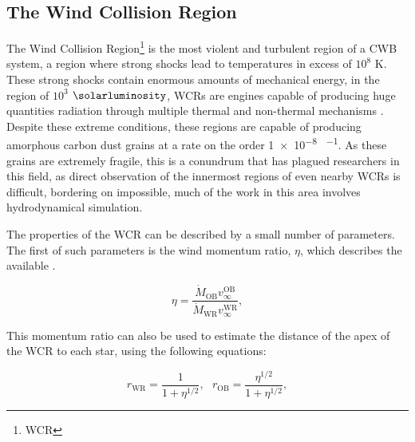 


\subsection{The Wind Collision Region}
\label{sec:wcr}

The Wind Collision Region\footnote{WCR} is the most violent and turbulent region of a CWB system, a region where strong shocks lead to temperatures in excess of $10^8$ $\si{\kelvin}$.
These strong shocks contain enormous amounts of mechanical energy, in the region of $10^3$ $\si{\solarluminosity}$, WCRs are engines capable of producing huge quantities radiation through multiple thermal and non-thermal mechanisms \parencite{eichler_particle_1993,grimaldoProtonAccelerationColliding2019}.
Despite these extreme conditions, these regions are capable of producing amorphous carbon dust grains at a rate on the order \num{1e-8} \si{\solarmass\per\year}.
As these grains are extremely fragile, this is a conundrum that has plagued researchers in this field, as direct observation of the innermost regions of even nearby WCRs is difficult, bordering on impossible, much of the work in this area involves hydrodynamical simulation.



The properties of the WCR can be described by a small number of parameters.
The first of such parameters is the wind momentum ratio, $\eta$, which describes the available \parencite{usov_stellar_1991}.


\begin{equation}
  \eta = \frac{\dot M_\text{OB} v_\infty^\text{OB}}{\dot M_\text{WR} v_\infty^\text{WR}},
\end{equation}


This momentum ratio can also be used to estimate the distance of the apex of the WCR to each star, using the following equations:

\begin{equation}
  r_\text{WR} = \frac{1}{1+\eta^{1/2}} , ~~~ r_\text{OB} = \frac{\eta^{1/2}}{1+\eta^{1/2}},
\end{equation}

